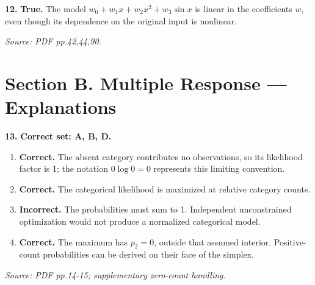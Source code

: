 \documentclass[11pt,a4paper]{article}
\begin{document}
\par\noindent\begin{minipage}{\linewidth}
\textbf{12.} \textbf{True.} The model \(w_0+w_1x+w_2x^2+w_3\sin x\) is linear in the coefficients \(w\), even though its dependence on the original input is nonlinear.

{\footnotesize\textit{Source: PDF pp.42,44,90.}}
\end{minipage}\par\vspace{3mm}
\newpage\section*{Section B. Multiple Response --- Explanations}
\par\noindent\begin{minipage}{\linewidth}
\textbf{13.} \textbf{Correct set: A, B, D.}
\begin{enumerate}[label=(\Alph*),leftmargin=8mm,itemsep=2pt,topsep=2pt]
\item \textbf{Correct.} The absent category contributes no observations, so its likelihood factor is 1; the notation \(0\log0=0\) represents this limiting convention.
\item \textbf{Correct.} The categorical likelihood is maximized at relative category counts.
\item \textbf{Incorrect.} The probabilities must sum to 1. Independent unconstrained optimization would not produce a normalized categorical model.
\item \textbf{Correct.} The maximum has \(p_2=0\), outside that assumed interior. Positive-count probabilities can be derived on their face of the simplex.
\end{enumerate}
{\footnotesize\textit{Source: PDF pp.14-15; supplementary zero-count handling.}}

\end{minipage}\par\vspace{3mm}
\end{document}
